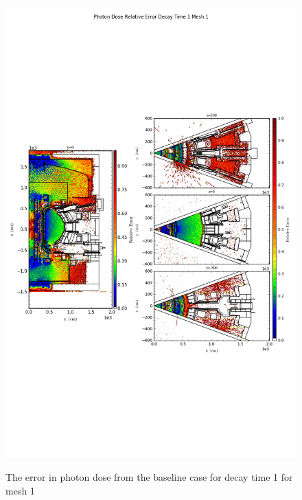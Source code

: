 \begin{figure}[ht!]
\centering
\includegraphics[trim={0cm 9cm 0cm 10cm},clip,scale=0.75]{../plots/final_model_nob4c/Photon_Dose_Relative_Error_Decay_Time_1_Mesh_1.png}
\label{fig:photons_dc1_no4bc_m1_error}
\caption{The error in photon dose from the baseline case for decay time 1 for mesh 1}
\end{figure}
